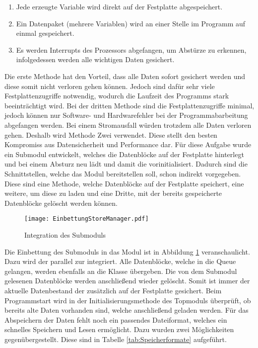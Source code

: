 \begin{enumerate}
\item Jede erzeugte Variable wird direkt auf der Festplatte abgespeichert.
\item Ein Datenpaket (mehrere Variablen) wird an einer Stelle im Programm auf
einmal gespeichert.
\item Es werden Interrupts des Prozessors abgefangen, um Abst{\"u}rze zu erkennen,
infolgedessen werden alle wichtigen Daten gesichert.
\end{enumerate}

Die erste Methode hat den Vorteil, dass alle Daten sofort gesichert werden und
diese somit nicht verloren gehen k{\"o}nnen. Jedoch sind daf{\"u}r sehr viele
Festplattenzugriffe notwendig, wodurch die Laufzeit des Programms stark
beeintr{\"a}chtigt wird. Bei der dritten Methode sind die Festplattenzugriffe
minimal, jedoch k{\"o}nnen nur Software- und Hardwarefehler bei der
Programmabarbeitung abgefangen werden. Bei einem Stromausfall w{\"u}rden
trotzdem alle Daten verloren gehen. Deshalb wird Methode Zwei verwendet. Diese
stellt den besten Kompromiss aus Datensicherheit und Performance dar. \newline
F{\"u}r diese Aufgabe wurde ein Submodul entwickelt, welches die Datenbl{\"o}cke
auf der Festplatte hinterlegt und bei einem Absturz neu l{\"a}dt und damit die
 vorinitialisiert. Dadurch sind die Schnittstellen,
welche das Modul bereitstellen soll, schon indirekt vorgegeben. Diese sind eine
Methode, welche Datenbl{\"o}cke auf der Festplatte speichert, eine weitere, um
diese zu laden und eine Dritte, mit der bereits gespeicherte Datenbl{\"o}cke
gel{\"o}scht werden k{\"o}nnen.

\begin{figure}[H]
	\centering
	\texttt{[image: EinbettungStoreManager.pdf]}
	\caption{Integration des Submoduls }
	\label{fig:EinbettungStoreManager}
\end{figure}

Die Einbettung des Submoduls  in das Modul  ist
in Abbildung \ref{fig:EinbettungStoreManager} veranschaulicht. Dazu wird der
 parallel zur  integriert. Alle
Datenbl{\"o}cke, welche in die Queue gelangen, werden ebenfalls an die
Klasse  {\"u}bergeben. Die von dem Submodul 
gelesenen Datenbl{\"o}cke werden anschließend wieder gel{\"o}scht. Somit ist immer der
aktuelle Datenbestand der 
zus{\"a}tzlich auf der Festplatte gesichert. Beim Programmstart wird in der
Initialisierungsmethode des Topmoduls {\"u}berpr{\"u}ft, ob bereits alte Daten vorhanden
sind, welche anschlie{\ss}end geladen werden. \newline
F{\"u}r das Abspeichern der
Daten fehlt noch ein passendes Dateiformat, welches ein schnelles Speichern und
Lesen erm{\"o}glicht. Dazu wurden zwei M{\"o}glichkeiten gegen{\"u}bergestellt. Diese sind
in Tabelle \ref{tab:Speicherformate} aufgef{\"u}hrt.

